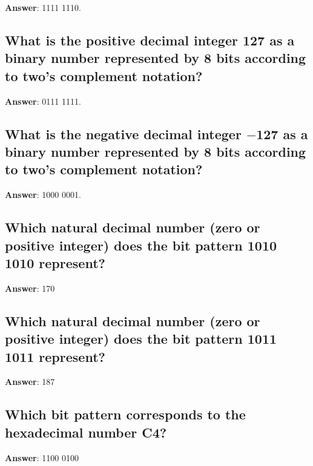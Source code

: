 \documentclass[a4paper,11pt,oneside]{article}
\begin{document}
\begin{sloppypar}
\label{q:370:sa:en:True}

\textbf{Answer}: 1111 1110.



\subsection{What is the positive decimal integer 127 as a binary number represented by 8 bits according to two's complement notation?}

\label{q:371:sa:en:True}

\textbf{Answer}: 0111 1111.



\subsection{What is the negative decimal integer \ensuremath{-}127 as a binary number represented by 8 bits according to two's complement notation?}

\label{q:372:sa:en:True}

\textbf{Answer}: 1000 0001.



\subsection{Which natural decimal number (zero or positive integer) does the bit pattern 1010 1010 represent?}

\label{q:373:sa:en:True}

\textbf{Answer}: 170



\subsection{Which natural decimal number (zero or positive integer) does the bit pattern 1011 1011 represent?}

\label{q:374:sa:en:True}

\textbf{Answer}: 187



\subsection{Which bit pattern corresponds to the hexadecimal number C4?}

\label{q:375:sa:en:True}

\textbf{Answer}: 1100 0100




\end{sloppypar}
\end{document}

